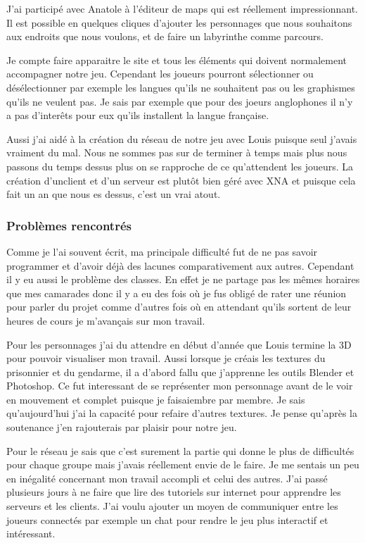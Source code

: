 \documentclass[12pt]{article}
\begin{document}
J’ai participé avec Anatole à l’éditeur de  maps qui est réellement impressionnant. Il est possible en quelques cliques d’ajouter les personnages que nous souhaitons aux endroits que nous voulons, et de faire un labyrinthe  comme parcours.

Je compte  faire apparaitre le site et tous les éléments qui doivent normalement accompagner notre jeu. Cependant les joueurs pourront sélectionner ou désélectionner par exemple les langues qu’ils ne souhaitent pas ou les graphismes qu’ils ne veulent pas. Je sais par exemple que pour des joeurs anglophones il n'y a pas d'interêts pour eux qu'ils installent la langue française.

Aussi j'ai aidé à la création du réseau de notre jeu avec Louis puisque seul j'avais vraiment du mal. Nous ne sommes pas sur de terminer à temps mais plus nous passons du temps dessus plus on se rapproche de ce qu'attendent les joueurs. La création d'unclient et d'un serveur est plutôt bien géré avec XNA et puisque cela fait un an que nous es dessus, c'est un vrai atout.

\newpage
\subsubsection{Problèmes rencontrés}

Comme je l’ai souvent écrit, ma principale difficulté fut de ne pas savoir programmer et d’avoir déjà des lacunes comparativement aux autres. Cependant il y eu aussi le problème des classes. En effet je ne partage pas les mêmes horaires que mes camarades donc il y a eu des fois où je fus obligé de rater une réunion pour parler du projet comme d’autres fois où en attendant qu’ils sortent de leur heures de cours je m’avançais sur mon travail.

Pour les personnages j’ai du attendre en début d’année que Louis termine la 3D pour pouvoir visualiser mon travail. Aussi lorsque je créais les textures du prisonnier et du gendarme, il a d’abord fallu que j’apprenne  les outils Blender et Photoshop. Ce fut interessant de se représenter mon personnage avant de le voir en mouvement et complet puisque je faisaiembre par membre.  Je sais qu’aujourd’hui j’ai la capacité pour refaire d’autres textures. Je pense qu’après la soutenance j’en rajouterais par plaisir pour notre jeu.

Pour le réseau je sais que c’est surement la partie qui donne le plus de difficultés pour chaque groupe mais j’avais réellement envie de le faire. Je me sentais un peu en inégalité concernant mon travail accompli et celui des autres. J’ai passé plusieurs jours à ne faire que lire des tutoriels sur internet pour apprendre les serveurs et les clients. J’ai voulu ajouter un moyen de communiquer entre les joueurs connectés par exemple un chat pour rendre le jeu plus interactif et intéressant.
\end{document}
